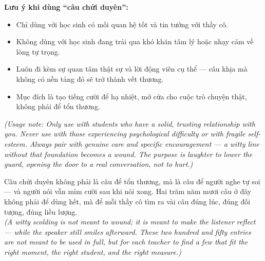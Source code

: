 \begin{enumerate}[leftmargin=*,resume]


\end{enumerate}

\begin{tuhocnhanh}
\textbf{Lưu ý khi dùng ``câu chửi duyên'':}\\[4pt]
\begin{itemize}[leftmargin=*]
  \item Chỉ dùng với học sinh có mối quan hệ tốt và tin tưởng với thầy cô.
  \item Không dùng với học sinh đang trải qua khó khăn tâm lý hoặc nhạy cảm về lòng tự trọng.
  \item Luôn đi kèm sự quan tâm thật sự và lời động viên cụ thể --- câu khịa mà không có nền tảng đó sẽ trở thành vết thương.
  \item Mục đích là tạo tiếng cười để hạ nhiệt, mở cửa cho cuộc trò chuyện thật, không phải để tổn thương.
\end{itemize}
\textit{(Usage note: Only use with students who have a solid, trusting relationship with you. Never use with those experiencing psychological difficulty or with fragile self-esteem. Always pair with genuine care and specific encouragement --- a witty line without that foundation becomes a wound. The purpose is laughter to lower the guard, opening the door to a real conversation, not to hurt.)}
\end{tuhocnhanh}

\begin{baihoc}
Câu chửi duyên không phải là câu để tổn thương, mà là câu để người nghe tự soi --- và người nói vẫn mỉm cười sau khi nói xong. Hai trăm năm mươi câu ở đây không phải để dùng hết, mà để mỗi thầy cô tìm ra vài câu đúng lúc, đúng đối tượng, đúng liều lượng.\\
\textit{(A witty scolding is not meant to wound; it is meant to make the listener reflect --- while the speaker still smiles afterward. These two hundred and fifty entries are not meant to be used in full, but for each teacher to find a few that fit the right moment, the right student, and the right measure.)}
\end{baihoc}
